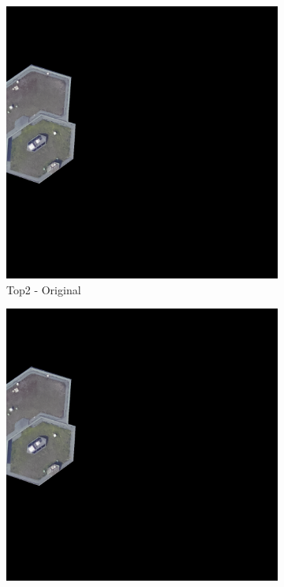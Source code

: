 \begin{figure}[H]
\begin{subfigure}{0.32\textwidth}
    \includegraphics[width=\textwidth]{02-main//figures/ch4/kfold_ensembles/unetplusplus_tu-efficientnetv2_rw_s.ra2_in1k/worst_cases/worst_3_iou0.000_25001117_tile_3_9_5ba8f7_original.png}
    \caption{Top2 - Original}
\end{subfigure}
\hfill
\begin{subfigure}{0.32\textwidth}
    \includegraphics[width=\textwidth]{02-main//figures/ch4/kfold_ensembles/unetplusplus_tu-efficientnetv2_rw_s.ra2_in1k/worst_cases/worst_3_iou0.000_25001117_tile_3_9_5ba8f7_overlay_gt.png}

\end{subfigure}
\end{figure}
